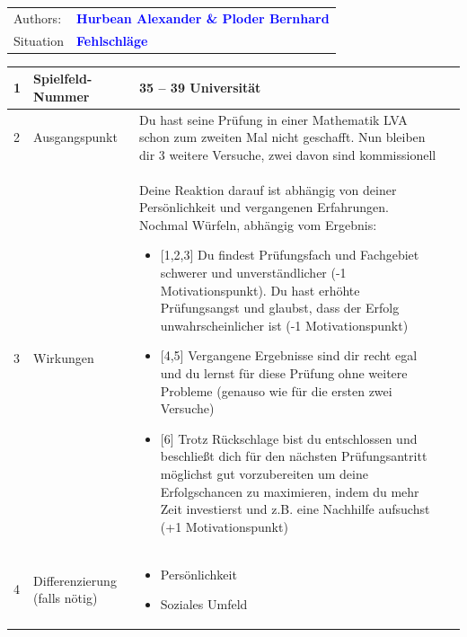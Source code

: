 \documentclass[12pt, a4paper]{article}
\newcommand{\authortext}{Hurbean Alexander \& Ploder Bernhard}
\newcommand{\situation}{Fehlschläge}
\begin{document}
\begin{tabular}{l l} 
Authors: & \textbf{\textcolor{blue}{\large\authortext}}\\ 
Situation & \textbf{\textcolor{blue}{\large\situation}}
\end{tabular}

\vspace{1em}

\centerline{
	}

\vspace{1em}

\begin{table}[h!]
	\begin{tabularx}{\textwidth}{|p{0.3cm}|p{3.5cm}|X|p{0.3cm}|}
		\hline
		1 & Spielfeld-Nummer                       & 35 – 39 Universität &  \\
		\hline
		2 & Ausgangspunkt                          & 
		Du hast seine Prüfung in einer Mathematik LVA schon zum zweiten Mal nicht geschafft.
		Nun bleiben dir 3 weitere Versuche, zwei davon sind kommissionell &  \\
		\hline
		3 & Wirkungen                              &
		Deine Reaktion darauf ist abhängig von deiner Persönlichkeit und vergangenen Erfahrungen. Nochmal Würfeln, abhängig vom Ergebnis:
		\begin{itemize}[noitemsep, topsep=0pt]
			\item {[1,2,3]} Du findest Prüfungsfach und Fachgebiet schwerer und unverständlicher (-1 Motivationspunkt).	Du hast erhöhte Prüfungsangst und glaubst, dass der Erfolg unwahrscheinlicher ist (-1 Motivationspunkt)
			\item {[4,5]} Vergangene Ergebnisse sind dir recht egal und du lernst für diese Prüfung ohne weitere Probleme (genauso wie für die ersten zwei Versuche)
			\item {[6]} Trotz Rückschlage bist du entschlossen und beschließt dich für den nächsten Prüfungsantritt möglichst gut vorzubereiten um deine Erfolgschancen zu maximieren, indem du mehr Zeit investierst und z.B. eine Nachhilfe aufsuchst (+1 Motivationspunkt)
		\end{itemize} &  \\
		\hline
		4 & Differenzierung \newline (falls nötig) & 
		\begin{itemize}[noitemsep, topsep=0pt]
			\item Persönlichkeit
			\item Soziales Umfeld

\end{itemize}
\end{tabularx}
\end{table}
\end{document}
